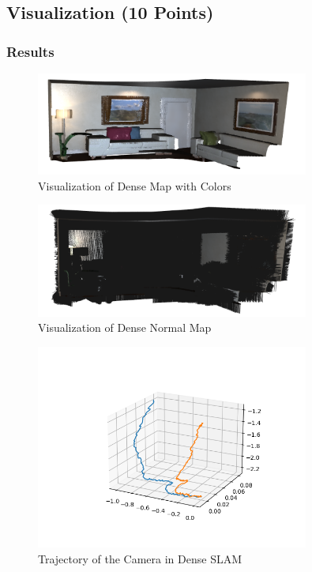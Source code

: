 \documentclass[12pt, a4paper]{article}
\begin{document}
\clearpage
\subsection{Visualization (10 Points)}
\subsubsection{Results}
\begin{figure}[!htb]
    \centering
    \includegraphics[width=0.8\textwidth]{SLAM_Visual.png}
    \caption{Visualization of Dense Map with Colors}
\end{figure}
\begin{figure}[!htb]
    \centering
    \includegraphics[width=0.8\textwidth]{Normal_SLAM.png}
    \caption{Visualization of Dense Normal Map}
\end{figure}
\begin{figure}[!htb]
    \centering
    \includegraphics[width=0.8\textwidth]{SLAM_Traj.png}
    \caption{Trajectory of the Camera in Dense SLAM}
\end{figure}
\end{document}
